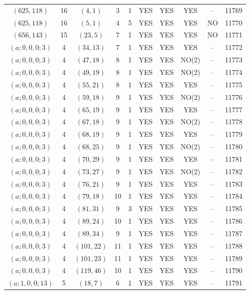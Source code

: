 \begin{longtable}{|c|c|c|c|c|c|c|c|c|c|}
$(625, 118)$ & 16 & $(4, 1)$ & 3 & 1 & YES & YES & YES & -- & 11769\\
$(625, 118)$ & 16 & $(5, 1)$ & 4 & 5 & YES & YES & YES & NO & 11770\\
$(656, 143)$ & 15 & $(23, 5)$ & 7 & 1 & YES & YES & YES & NO & 11771\\
$(a; 0, 0, 0; 3)$ & 4 & $(34, 13)$ & 7 & 1 & YES & YES & YES & -- & 11772\\
$(a; 0, 0, 0; 3)$ & 4 & $(47, 18)$ & 8 & 1 & YES & YES & NO(2) & -- & 11773\\
$(a; 0, 0, 0; 3)$ & 4 & $(49, 19)$ & 8 & 1 & YES & YES & NO(2) & -- & 11774\\
$(a; 0, 0, 0; 3)$ & 4 & $(55, 21)$ & 8 & 1 & YES & YES & YES & -- & 11775\\
$(a; 0, 0, 0; 3)$ & 4 & $(59, 18)$ & 9 & 1 & YES & YES & NO(2) & -- & 11776\\
$(a; 0, 0, 0; 3)$ & 4 & $(65, 19)$ & 9 & 1 & YES & YES & YES & -- & 11777\\
$(a; 0, 0, 0; 3)$ & 4 & $(67, 18)$ & 9 & 1 & YES & YES & NO(2) & -- & 11778\\
$(a; 0, 0, 0; 3)$ & 4 & $(68, 19)$ & 9 & 1 & YES & YES & YES & -- & 11779\\
$(a; 0, 0, 0; 3)$ & 4 & $(68, 25)$ & 9 & 1 & YES & YES & NO(2) & -- & 11780\\
$(a; 0, 0, 0; 3)$ & 4 & $(70, 29)$ & 9 & 1 & YES & YES & YES & -- & 11781\\
$(a; 0, 0, 0; 3)$ & 4 & $(73, 27)$ & 9 & 1 & YES & YES & NO(2) & -- & 11782\\
$(a; 0, 0, 0; 3)$ & 4 & $(76, 21)$ & 9 & 1 & YES & YES & YES & -- & 11783\\
$(a; 0, 0, 0; 3)$ & 4 & $(79, 18)$ & 10 & 1 & YES & YES & YES & -- & 11784\\
$(a; 0, 0, 0; 3)$ & 4 & $(81, 31)$ & 9 & 3 & YES & YES & YES & -- & 11785\\
$(a; 0, 0, 0; 3)$ & 4 & $(89, 24)$ & 10 & 1 & YES & YES & YES & -- & 11786\\
$(a; 0, 0, 0; 3)$ & 4 & $(89, 34)$ & 9 & 1 & YES & YES & YES & -- & 11787\\
$(a; 0, 0, 0; 3)$ & 4 & $(101, 22)$ & 11 & 1 & YES & YES & YES & -- & 11788\\
$(a; 0, 0, 0; 3)$ & 4 & $(101, 23)$ & 11 & 1 & YES & YES & YES & -- & 11789\\
$(a; 0, 0, 0; 3)$ & 4 & $(119, 46)$ & 10 & 1 & YES & YES & YES & -- & 11790\\
$(a; 1, 0, 0; 13)$ & 5 & $(18, 7)$ & 6 & 1 & YES & YES & YES & -- & 11791\\

\end{longtable}
